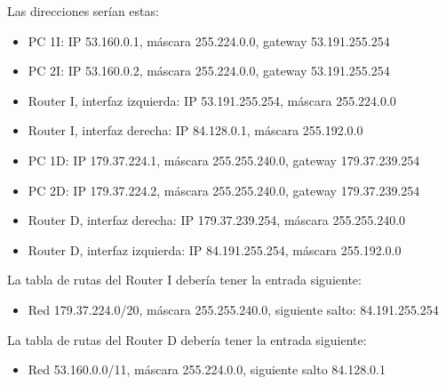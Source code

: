 \documentclass[letterpaper,10pt,spanish]{sphinxmanual}
\begin{document}
\sphinxAtStartPar
Las direcciones serían estas:
\begin{itemize}
\item {} 
\sphinxAtStartPar
PC 1I: IP 53.160.0.1, máscara 255.224.0.0, gateway 53.191.255.254

\item {} 
\sphinxAtStartPar
PC 2I: IP 53.160.0.2, máscara 255.224.0.0, gateway 53.191.255.254

\item {} 
\sphinxAtStartPar
Router I, interfaz izquierda: IP 53.191.255.254, máscara 255.224.0.0

\item {} 
\sphinxAtStartPar
Router I, interfaz derecha: IP 84.128.0.1, máscara 255.192.0.0

\item {} 
\sphinxAtStartPar
PC 1D: IP 179.37.224.1, máscara 255.255.240.0, gateway 179.37.239.254

\item {} 
\sphinxAtStartPar
PC 2D: IP 179.37.224.2, máscara 255.255.240.0, gateway 179.37.239.254

\item {} 
\sphinxAtStartPar
Router D, interfaz derecha: IP 179.37.239.254, máscara 255.255.240.0

\item {} 
\sphinxAtStartPar
Router D, interfaz izquierda: IP 84.191.255.254, máscara 255.192.0.0

\end{itemize}

\sphinxAtStartPar
La tabla de rutas del Router I debería tener la entrada siguiente:
\begin{itemize}
\item {} 
\sphinxAtStartPar
Red 179.37.224.0/20, máscara 255.255.240.0, siguiente salto: 84.191.255.254

\end{itemize}

\sphinxAtStartPar
La tabla de rutas del Router D debería tener la entrada siguiente:
\begin{itemize}
\item {} 
\sphinxAtStartPar
Red 53.160.0.0/11, máscara 255.224.0.0, siguiente salto 84.128.0.1

\end{itemize}
\end{document}
